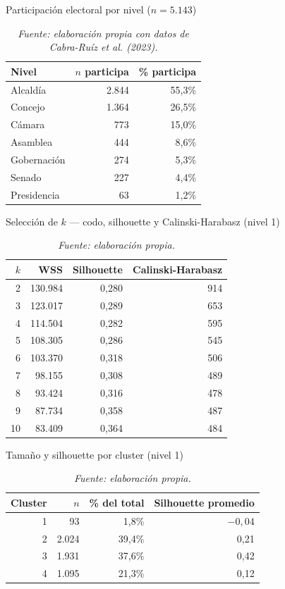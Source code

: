 \documentclass[11pt,letterpaper]{article}
\begin{document}
\begin{table}[htbp]
\centering
\small
\caption{Participación electoral por nivel ($n=5{.}143$)}
\label{tab:A3}
\begin{tabular}{@{}lrr@{}}
\toprule
Nivel & $n$ participa & \% participa \\
\midrule
Alcaldía & 2.844 & 55,3\% \\
Concejo & 1.364 & 26,5\% \\
Cámara & 773 & 15,0\% \\
Asamblea & 444 & 8,6\% \\
Gobernación & 274 & 5,3\% \\
Senado & 227 & 4,4\% \\
Presidencia & 63 & 1,2\% \\
\bottomrule
\end{tabular}
\vspace{0.3em}
\caption*{\footnotesize\color{mutedgray}\itshape Fuente: elaboración propia con datos de Cabra-Ruíz et al. (2023).}
\end{table}

\begin{table}[htbp]
\centering
\small
\caption{Selección de $k$ --- codo, silhouette y Calinski-Harabasz (nivel 1)}
\label{tab:A4}
\begin{tabular}{@{}rrrr@{}}
\toprule
$k$ & WSS & Silhouette & Calinski-Harabasz \\
\midrule
2 & 130.984 & 0,280 & 914 \\
3 & 123.017 & 0,289 & 653 \\
4 & 114.504 & 0,282 & 595 \\
5 & 108.305 & 0,286 & 545 \\
6 & 103.370 & 0,318 & 506 \\
7 & 98.155 & 0,308 & 489 \\
8 & 93.424 & 0,316 & 478 \\
9 & 87.734 & 0,358 & 487 \\
10 & 83.409 & 0,364 & 484 \\
\bottomrule
\end{tabular}
\vspace{0.3em}
\caption*{\footnotesize\color{mutedgray}\itshape Fuente: elaboración propia.}
\end{table}

\begin{table}[htbp]
\centering
\small
\caption{Tamaño y silhouette por cluster (nivel 1)}
\label{tab:A5}
\begin{tabular}{@{}rrrr@{}}
\toprule
Cluster & $n$ & \% del total & Silhouette promedio \\
\midrule
1 & 93 & 1,8\% & $-0,04$ \\
2 & 2.024 & 39,4\% & 0,21 \\
3 & 1.931 & 37,6\% & 0,42 \\
4 & 1.095 & 21,3\% & 0,12 \\
\bottomrule
\end{tabular}
\vspace{0.3em}
\caption*{\footnotesize\color{mutedgray}\itshape Fuente: elaboración propia.}
\end{table}
\end{document}
